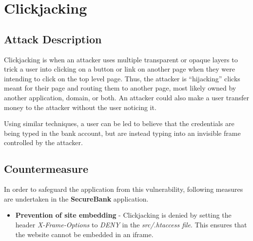 \section{Clickjacking}

\subsection{Attack Description}
Clickjacking is when an attacker uses multiple transparent or opaque layers to trick a user into clicking on a button or link on another page when they were intending to click on the top level page. Thus, the attacker is \enquote{hijacking} clicks meant for their page and routing them to another page, most likely owned by another application, domain, or both. 
An attacker could also make a user transfer money to the attacker without the user noticing it.

Using similar techniques, a user can be led to believe that the credentials are being typed in the bank account, but are instead typing into an invisible frame controlled by the attacker.

\subsection{Countermeasure}
In order to safeguard the application from this vulnerability, following measures are undertaken in the \textbf{SecureBank} application.
\begin{itemize}
\item \textbf{Prevention of site embedding} - Clickjacking is denied by setting the header \textit{X-Frame-Options} to \textit{DENY} in the \textit{src/.htaccess file}. This ensures that the website cannot be embedded in an iframe.
\end{itemize}

\clearpage